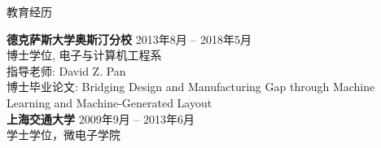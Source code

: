 

\begin{rSection}{教育经历}


{\bf 德克萨斯大学奥斯汀分校} \hfill {2013年8月 -- 2018年5月} \\ 
博士学位, 电子与计算机工程系 \\
指导老师: David Z. Pan \\
博士毕业论文: Bridging Design and Manufacturing Gap through Machine Learning and Machine-Generated Layout \\

{\bf 上海交通大学} \hfill {2009年9月 -- 2013年6月} \\ 
学士学位，微电子学院 \\

\end{rSection}

